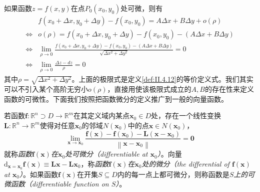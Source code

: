 \documentclass[main.tex]{subfiles}
\begin{document}
如果函数$z=f\left(x,y\right)$在点$P_0\left(x_0,y_0\right)$处可微，则有
\begin{align*}
                    & f\left(x_0+\Delta x,y_0+\Delta y\right)-f\left(x_0,y_0\right)=A\Delta x+B\Delta y+o\left(\rho\right)                                                 \\
    \Leftrightarrow & o\left(\rho\right)=f\left(x_0+\Delta x,y_0+\Delta y\right)-f\left(x_0,y_0\right)-\left(A\Delta x+B\Delta y\right)                                    \\
    \Leftrightarrow & \lim_{\rho\to0}\frac{f\left(x_0+\Delta x,y_0+\Delta y\right)-f\left(x_0,y_0\right)-\left(A\Delta x+B\Delta y\right)}{\sqrt{\Delta x^2+\Delta y^2}}=0 \\
    \Leftrightarrow & \lim_{\rho\to0}\frac{\Delta z-dz}{\rho}=0
\end{align*}
其中$\rho=\sqrt{\Delta x^2+\Delta y^2}$。上面的极限式是定义\ref{def:II.4.12}的等价定义式。我们其实可以不引入某个高阶无穷小$o\left(\rho\right)$，直接用使该极限式成立的$A,B$的存在性来定义函数的可微性。下面我们按照把函数微分的定义推广到一般的向量函数。

\begin{definition}[向量值函数的微分]\label{def:II.4.13}
    若函数$\mathbf{f}:\mathbb{R}^n\supset D\rightarrow\mathbb{R}^m$在其定义域内某点$\mathbf{x}_0\in D$处，存在一个线性变换$\mathbf{L}:\mathbb{R}^n\rightarrow\mathbb{R}^m$使得对任意$\mathbf{x}_0$的邻域$N\left(\mathbf{x}_0\right)$中的点$\mathbf{x}\in N\left(\mathbf{x}_0\right)$，
    \[\lim_{\mathbf{x}\rightarrow\mathbf{x}_0}\frac{\mathbf{f}\left(\mathbf{x}\right)-\mathbf{f}\left(\mathbf{x}_0\right)-\mathbf{L}\left(\mathbf{x}-\mathbf{x}_0\right)}{\left\|\mathbf{x}-\mathbf{x}_0\right\|}=\mathbf{0}\]
    就称\emph{函数$\mathbf{f}\left(\mathbf{x}\right)$在$\mathbf{x}_0$处可微分（differentiable at $\mathbf{x}_0$）}。向量$\mathrm{d}_{\mathbf{x}=\mathbf{x}_0}\mathbf{f}\left(\mathbf{x}\right)\equiv\mathbf{Lx}-\mathbf{Lx}_0$，称\emph{函数$\mathbf{f}\left(\mathbf{x}\right)$在$\mathbf{x}_0$处的微分（the differential of $\mathbf{f}\left(\mathbf{x}\right)$ at $\mathbf{x}_0$）}。如果函数$\mathbf{f}\left(\mathbf{x}\right)$在开集$S\subseteq D$内的每一点上都可微分，则称函数是\emph{$S$上的可微函数（differentiable function on $S$）}。
\end{definition}
\end{document}
